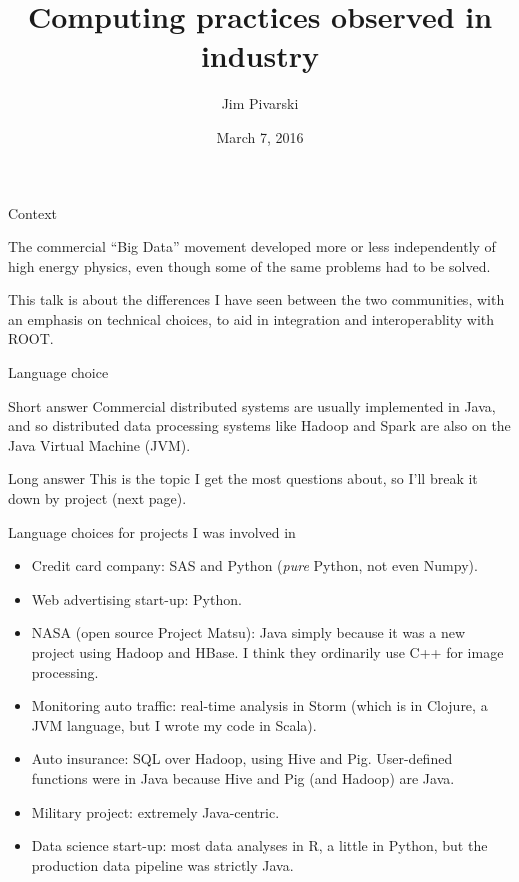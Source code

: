 \documentclass{beamer}
\title[2016-03-07-rootteam-hadoop]{Computing practices observed in industry}
\author{Jim Pivarski}
\institute{Princeton University -- DIANA}
\date{March 7, 2016}
\begin{document}
\begin{frame}
  \titlepage
\end{frame}

\begin{frame}{Context}

\begin{block}{}
The commercial ``Big Data'' movement developed more or less independently of high energy physics, even though some of the same problems had to be solved.
\end{block}

\begin{block}{}
This talk is about the differences I have seen between the two communities, with an emphasis on technical choices, to aid in integration and interoperablity with ROOT.
\end{block}
\end{frame}

\begin{frame}{Language choice}
\begin{block}{Short answer}
Commercial distributed systems are usually implemented in Java, and so distributed data processing systems like Hadoop and Spark are also on the Java Virtual Machine (JVM).
\end{block}

\begin{block}{Long answer}
This is the topic I get the most questions about, so I'll break it down by project (next page).
\end{block}
\end{frame}

\begin{frame}{Language choices for projects I was involved in}
\begin{itemize}
\item Credit card company: SAS and Python ({\it pure} Python, not even Numpy).

\item Web advertising start-up: Python.

\item NASA (open source Project Matsu): Java simply because it was a new project using Hadoop and HBase. I think they ordinarily use C++ for image processing.

\item Monitoring auto traffic: real-time analysis in Storm (which is in Clojure, a JVM language, but I wrote my code in Scala).

\item Auto insurance: SQL over Hadoop, using Hive and Pig. User-defined functions were in Java because Hive and Pig (and Hadoop) are Java.

\item Military project: extremely Java-centric.

\item Data science start-up: most data analyses in R, a little in Python, but the production data pipeline was strictly Java.
\end{itemize}
\end{frame}
\end{document}
